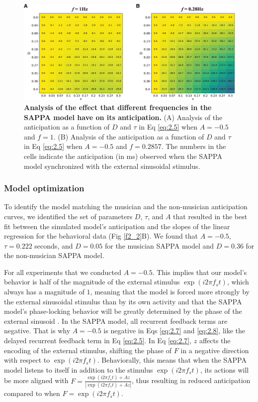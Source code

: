 \documentclass{report}
\begin{document}
\begin{figure}
    \centering
    \includegraphics[width=1.0\textwidth]{figures/fig2_7.png}
    \caption[Analysis of the effect that different frequencies in the SAPPA model have on its anticipation]{\textbf{Analysis of the effect that different frequencies in the SAPPA model have on its anticipation.} (A) Analysis of the anticipation as a function of $D$ and $\tau$ in Eq \eqref{eq:2.5} when $A = -0.5$ and $f = 1$. (B) Analysis of the anticipation as a function of $D$ and $\tau$ in Eq \eqref{eq:2.5} when $A = -0.5$ and $f = 0.2857$. The numbers in the cells indicate the anticipation (in ms) observed when the SAPPA model synchronized with the external sinusoidal stimulus.}
    \label{f2_7}
\end{figure}

\subsubsection{Model optimization}

To identify the model matching the musician and the non-musician anticipation curves, we identified the set of parameters $D$, $\tau$, and $A$ that resulted in the best fit between the simulated model's anticipation and the slopes of the linear regression for the behavioral data (Fig \ref{f2_2}B). We found that $A = -0.5$, $\tau = 0.222$ seconds, and $D = 0.05$ for the musician SAPPA model and $D = 0.36$ for the non-musician SAPPA model.

For all experiments that we conducted $A = -0.5$. This implies that our model's behavior is half of the magnitude of the external stimulus $\exp(i2\pi f_s t)$, which always has a magnitude of $1$, meaning that the model is forced more strongly by the external sinusoidal stimulus than by its own activity and that the SAPPA model's phase-locking behavior will be greatly determined by the phase of the external sinusoid \cite{kim2015signal}. In the SAPPA model, all recurrent feedback terms are negative. That is why $A = -0.5$ is negative in Eqs \eqref{eq:2.7} and \eqref{eq:2.8}, like the delayed recurrent feedback term in Eq \eqref{eq:2.5}. In Eq \eqref{eq:2.7}, $z$ affects the encoding of the external stimulus, shifting the phase of $F$ in a negative direction with respect to $\exp(i2\pi f_s t)$. Behaviorally, this means that when the SAPPA model listens to itself in addition to the stimulus $\exp(i2\pi f_s t)$, its actions will be more aligned with $F=\frac{\exp(i2\pi f_s t)+Az}{|\exp(i2\pi f_s t)+Az|}$, thus resulting in reduced anticipation compared to when $F = \exp(i2\pi f_s t)$.
\end{document}
